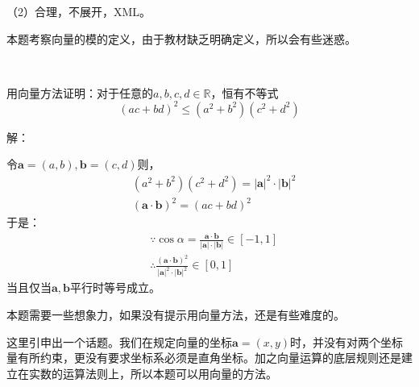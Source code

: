 （2）合理，不展开，XML。

\begin{tcolorbox}
本题考察向量的模的定义，由于教材缺乏明确定义，所以会有些迷惑。
\end{tcolorbox}

~

\begin{example}
用向量方法证明：对于任意的$a,b,c,d\in \mathbb{R} $，恒有不等式
\[
\left( ac+bd \right) ^2\leqslant \left( a^2+b^2 \right) \left( c^2+d^2 \right)
\]
\end{example}

解：

令$\boldsymbol{a}=\left( a,b \right) ,\boldsymbol{b}=\left( c,d \right) $则，
\begin{align*}
&\left( a^2+b^2 \right) \left( c^2+d^2 \right) =\left| \boldsymbol{a} \right|^2\cdot \left| \boldsymbol{b} \right|^2 \\
&\left( \boldsymbol{a}\cdot \boldsymbol{b} \right) ^2=\left( ac+bd \right) ^2
\end{align*}
于是：
\begin{align*}
&\because \cos \alpha =\frac{\boldsymbol{a}\cdot \boldsymbol{b}}{\left| \boldsymbol{a} \right|\cdot \left| \boldsymbol{b} \right|}\in \left[ -1,1 \right] \\
&\therefore \frac{\left( \boldsymbol{a}\cdot \boldsymbol{b} \right) ^2}{\left| \boldsymbol{a} \right|^2\cdot \left| \boldsymbol{b} \right|^2}\in \left[ 0,1 \right]
\end{align*}
当且仅当$\boldsymbol{a},\boldsymbol{b}$平行时等号成立。

\begin{tcolorbox}
本题需要一些想象力，如果没有提示用向量方法，还是有些难度的。
\end{tcolorbox}

\begin{tcolorbox}
这里引申出一个话题。我们在规定向量的坐标$\boldsymbol{a}=\left( x,y \right) $时，并没有对两个坐标量有所约束，更没有要求坐标系必须是直角坐标。加之向量运算的底层规则还是建立在实数的运算法则上，所以本题可以用向量的方法。
\end{tcolorbox}




